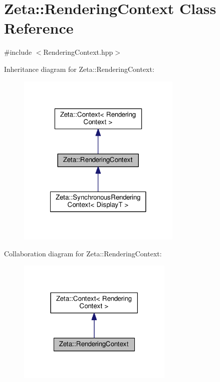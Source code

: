 \hypertarget{classZeta_1_1RenderingContext}{\section{Zeta\+:\+:Rendering\+Context Class Reference}
\label{classZeta_1_1RenderingContext}
}


{\ttfamily \#include $<$Rendering\+Context.\+hpp$>$}



Inheritance diagram for Zeta\+:\+:Rendering\+Context\+:\nopagebreak
\begin{figure}[H]
\begin{center}
\leavevmode
\includegraphics[width=222pt]{classZeta_1_1RenderingContext__inherit__graph}
\end{center}
\end{figure}


Collaboration diagram for Zeta\+:\+:Rendering\+Context\+:\nopagebreak
\begin{figure}[H]
\begin{center}
\leavevmode
\includegraphics[width=210pt]{classZeta_1_1RenderingContext__coll__graph}
\end{center}
\end{figure}
